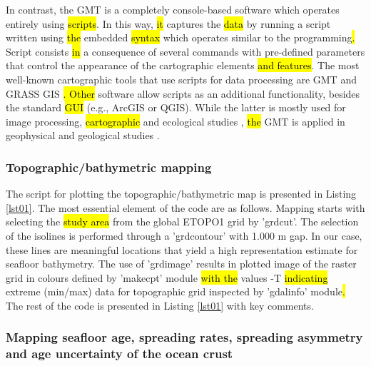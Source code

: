 \documentclass[geomatics,article,submit,pdftex,moreauthors]{Definitions/mdpi}
\begin{document}
In contrast, the GMT is a completely console-based software which operates entirely using \hl{scripts}. In this way, \hl{it} captures the \hl{data} by running a script written using \hl{the }embedded \hl{syntax} which operates similar to the programming\hl{. }Script consists \hl{in} a consequence of several commands with pre-defined parameters that control the appearance of the cartographic elements \hl{and features}. The most well-known cartographic tools that use scripts for data processing are GMT \cite{Lemenkova202217} and GRASS GIS \cite{NETELER2012124}\hl{. Other} software\hl{ }allow scripts as an additional functionality, besides the standard \hl{GUI }(e.g., ArcGIS or QGIS). While the latter is mostly used for image processing,\hl{ cartographic} and ecological studies\hl{ }\cite{ROCCHINI2017166,FRIGERI20111265,Lemenkova202313,SOROKINE2007685}, \hl{the }GMT is applied in geophysical and geological studies \cite{Lee,Lemenkova202206,DeSanto}.

\subsubsection{Topographic/bathymetric mapping}

The script for plotting the topographic/bathymetric map is presented in Listing \ref{lst01}. The most essential element of the code are as follows. Mapping starts with selecting the\hl{ study area} from the global ETOPO1 grid by 'grdcut'. The selection of the isolines is performed through a 'grdcontour' with 1.000 m gap. In our case, these lines are meaningful locations that yield a high representation estimate for seafloor bathymetry. The use of 'grdimage' results in plotted image of the raster grid in colours defined by 'makecpt' module\hl{ with the }values -T\hl{ indicating} extreme (min/max) data for topographic grid inspected by 'gdalinfo' module\hl{. }The rest of the code is presented in Listing \ref{lst01} with key comments.

\subsubsection{Mapping seafloor age, spreading rates, spreading asymmetry and age uncertainty of the ocean crust}
\end{document}
